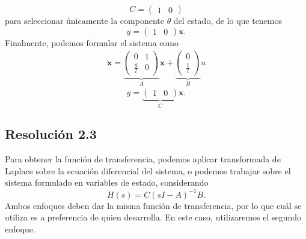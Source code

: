 \documentclass[
  11pt,
  letterpaper,
   addpoints,
  answers
  ]{exam}
\begin{document}
\begin{questions}
\begin{solution}
\begin{equation}
C=\begin{pmatrix}1&0\end{pmatrix}
\end{equation}
para seleccionar únicamente la componente $\theta$ del estado, de lo que tenemos
\begin{equation}
y=\begin{pmatrix}1&0\end{pmatrix}\mathbf{x}.
\end{equation}
Finalmente, podemos formular el sistema como
\begin{align}
\dot{\mathbf{x}} =
\underbrace{\begin{pmatrix}
0 & 1 \\[2pt]
\frac{g}{l} & 0
\end{pmatrix}}_{A} \mathbf{x} +
\underbrace{\begin{pmatrix}
0 \\[2pt]
\frac{1}{l}
\end{pmatrix}}_{B} u
\end{align}
\begin{equation}
y = \underbrace{\begin{pmatrix}1 & 0\end{pmatrix}}_{C} \mathbf{x}.
\end{equation}

\subsection*{Resolución 2.3}

Para obtener la función de transferencia, podemos aplicar transformada de Laplace sobre la ecuación diferencial del sistema, o podemos trabajar sobre el sistema formulado en variables de estado, considerando
\begin{equation}
H(s)=C(sI-A)^{-1}B.
\end{equation}
Ambos enfoques deben dar la misma función de transferencia, por lo que cuál se utiliza es a preferencia de quien desarrolla. En este caso, utilizaremos el segundo enfoque.


\end{solution}
\end{questions}
\end{document}
